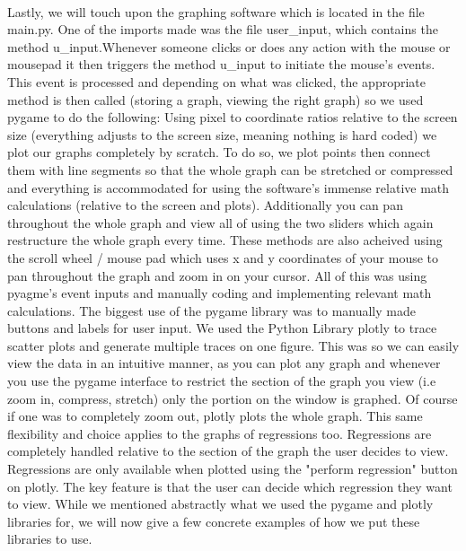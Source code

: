 \documentclass[fontsize=11pt]{article}
\begin{document}
\\Lastly, we will touch upon the graphing software which is located in the file main.py. One of the imports made was the file user\_input, which contains the method u\_input.Whenever someone clicks or does any action with the mouse or mousepad it then triggers the method u\_input to initiate the mouse's events. This event is processed and depending on what was clicked, the appropriate method is then called (storing a graph, viewing the right graph) so we used pygame to do the following:
Using pixel to coordinate ratios relative to the screen size (everything adjusts to the screen size, meaning nothing is hard coded) we plot our graphs completely by scratch. To do so, we plot points then connect them with line segments so that the whole graph can be stretched or compressed and everything is accommodated for using the software's immense relative math calculations (relative to the screen and plots). Additionally you can pan throughout the whole graph and view all of using the two sliders which again restructure the whole graph every time. These methods are also acheived using the scroll wheel / mouse pad which uses x and y coordinates of your mouse to pan throughout the graph and zoom in on your cursor. All of this was using pyagme's event inputs and manually coding and implementing relevant math calculations. The biggest use of the pygame library was to manually made buttons and labels for user input. We used the Python Library plotly to trace scatter plots and generate multiple traces on one figure. This was so we can easily view the data in an intuitive manner, as you can plot any graph and whenever you use the pygame interface to restrict the section of the graph you view (i.e zoom in, compress, stretch) only the portion on the window is graphed. Of course if one was to completely zoom out, plotly plots the whole graph. This same flexibility and choice applies to the graphs of regressions too. Regressions are completely handled relative to the section of the graph the user decides to view. Regressions are only available when plotted using the "perform regression" button on plotly. The key feature is that the user can decide which regression they want to view. While we mentioned abstractly what we used the pygame and plotly libraries for, we will now give a few concrete examples of how we put these libraries to use. \\
\end{document}

